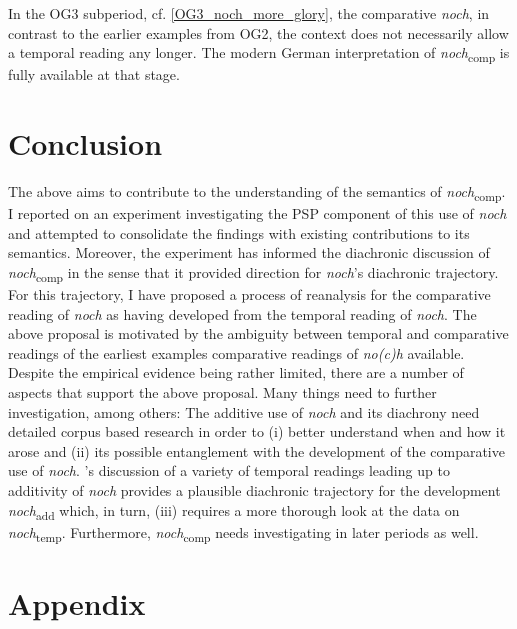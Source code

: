\documentclass[output=paper,
modfonts
]{langscibook}
\begin{document}
In the OG3 subperiod, cf. \ref{OG3_noch_more_glory}, the comparative \textit{noch}, in contrast to the earlier examples from OG2, the context does not necessarily allow a temporal reading any longer. The modern German interpretation of \textit{noch}\textsubscript{comp} is fully available at that stage.

\section{Conclusion}

The above aims to contribute to the understanding of the semantics of \textit{noch}\textsubscript{comp}. I reported on an experiment investigating the PSP component of this use of \textit{noch} and attempted to consolidate the findings with existing contributions to its semantics. Moreover, the experiment has informed the diachronic discussion of \textit{noch}\textsubscript{comp} in the sense that it provided direction for \textit{noch}'s diachronic trajectory. For this trajectory, I have proposed a process of reanalysis for the comparative reading of \textit{noch} as having developed from the temporal reading of \textit{noch}. The above proposal is motivated by the ambiguity between temporal and comparative readings of the earliest examples comparative readings of \textit{no(c)h} available. Despite the empirical evidence being rather limited, there are a number of aspects that support the above proposal. Many things need to further investigation, among others: The additive use of \textit{noch} and its diachrony need detailed corpus based research in order to (i) better understand when and how it arose and (ii) its possible entanglement with the development of the comparative use of \textit{noch}. \citeauthor{beck2016a_sub}'s \citeyearpar{beck2016a_sub} discussion of a variety of temporal readings leading up to additivity of \textit{noch} provides a plausible diachronic trajectory for the development \textit{noch}\textsubscript{add} which, in turn, (iii) requires a more thorough look at the data on \textit{noch}\textsubscript{temp}. Furthermore, \textit{noch}\textsubscript{comp} needs investigating in later periods as well.


{\sloppy\printbibliography[heading=subbibliography,notkeyword=this]}



\section*{Appendix}
\end{document}
